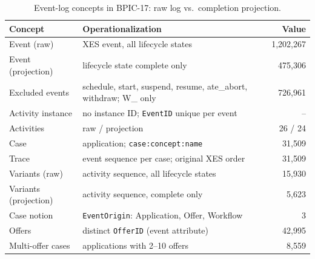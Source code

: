 
\begin{table}[htbp]
\centering
\small
\caption{Event-log concepts in BPIC-17: raw log vs.\ completion projection.}
\label{tab:concepts}
\begin{tabular}{@{}>{\raggedright\arraybackslash}p{}>{\raggedright\arraybackslash}p{}r@{}}
\toprule
Concept & Operationalization & Value \\
\midrule
Event (raw) & XES event, all lifecycle states & 1,202,267 \\
Event (projection) & lifecycle state complete only & 475,306 \\
Excluded events & schedule, start, suspend, resume, ate\_abort, withdraw; W\_ only & 726,961 \\
Activity instance & no instance ID; \texttt{EventID} unique per event & -- \\
Activities & raw / projection & 26 / 24 \\
Case & application; \texttt{case:concept:name} & 31,509 \\
Trace & event sequence per case; original XES order & 31,509 \\
Variants (raw) & activity sequence, all lifecycle states & 15,930 \\
Variants (projection) & activity sequence, complete only & 5,623 \\
Case notion & \texttt{EventOrigin}: Application, Offer, Workflow & 3 \\
Offers & distinct \texttt{OfferID} (event attribute) & 42,995 \\
Multi-offer cases & applications with 2--10 offers & 8,559 \\
\bottomrule
\end{tabular}
\end{table}
